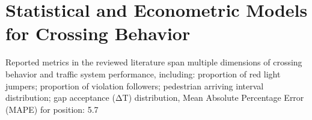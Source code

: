 \documentclass{article}
\begin{document}
\section{Statistical and Econometric Models for Crossing Behavior}
Reported metrics in the reviewed literature span multiple dimensions of crossing behavior and traffic system performance, including: proportion of red light jumpers; proportion of violation followers; pedestrian arriving interval distribution; gap acceptance (ΔT) distribution, Mean Absolute Percentage Error (MAPE) for position: 5.7%
\end{document}
